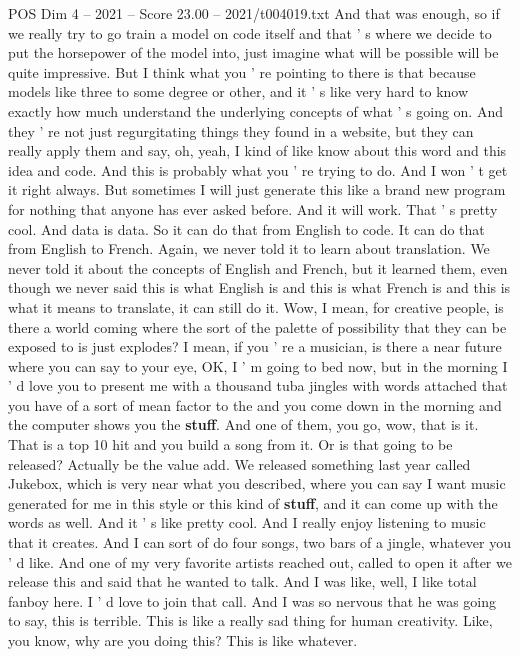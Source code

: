 \begin{textsample}{POS Dim 4 – 2021 – Score 23.00 – 2021/t004019.txt}
And that was enough, so if we really try to go train a model on code itself and that ' s where we decide to put the horsepower of the model into, just imagine what will be possible will be quite impressive.
But I think what you ' re pointing to there is that because models like three to some degree or other, and it ' s like very hard to know exactly how much understand the underlying concepts of what ' s going on.
And they ' re not just regurgitating things they found in a website, but they can really apply them and say, oh, yeah, I kind of like know about this word and this idea and code.
And this is probably what you ' re trying to do.
And I won ' t get it right always.
But sometimes I will just generate this like a brand new program for nothing that anyone has ever asked before.
And it will work.
That ' s pretty cool.
And data is data.
So it can do that from English to code.
It can do that from English to French.
Again, we never told it to learn about translation.
We never told it about the concepts of English and French, but it learned them, even though we never said this is what English is and this is what French is and this is what it means to translate, it can still do it.
Wow, I mean, for creative people, is there a world coming where the sort of the palette of possibility that they can be exposed to is just explodes?
I mean, if you ' re a musician, is there a near future where you can say to your eye, OK, I ' m going to bed now, but in the morning I ' d love you to present me with a thousand tuba jingles with words attached that you have of a sort of mean factor to the and you come down in the morning and the computer shows you the \textbf{stuff}.
And one of them, you go, wow, that is it.
That is a top 10 hit and you build a song from it.
Or is that going to be released?
Actually be the value add.
We released something last year called Jukebox, which is very near what you described, where you can say I want music generated for me in this style or this kind of \textbf{stuff}, and it can come up with the words as well.
And it ' s like pretty cool.
And I really enjoy listening to music that it creates.
And I can sort of do four songs, two bars of a jingle, whatever you ' d like.
And one of my very favorite artists reached out, called to open it after we release this and said that he wanted to talk.
And I was like, well, I like total fanboy here.
I ' d love to join that call.
And I was so nervous that he was going to say, this is terrible.
This is like a really sad thing for human creativity.
Like, you know, why are you doing this?
This is like whatever.

\end{textsample}
